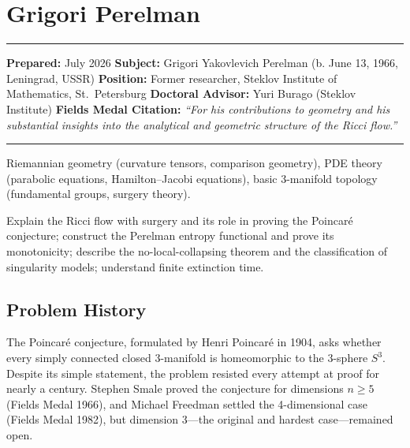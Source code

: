 \chapter{Grigori Perelman}\label{ch2006grigoriperelmandeclined:grigori-perelman-fields-medal-2006-declined}

\begin{center}\rule{0.5\linewidth}{0.5pt}\end{center}

\textbf{Prepared:} July 2026 \textbf{Subject:} Grigori Yakovlevich Perelman (b. June 13, 1966, Leningrad, USSR) \textbf{Position:} Former researcher, Steklov Institute of Mathematics, St.~Petersburg \textbf{Doctoral Advisor:} Yuri Burago (Steklov Institute) \textbf{Fields Medal Citation:} \emph{``For his contributions to geometry and his substantial insights into the analytical and geometric structure of the Ricci flow.''}

\begin{center}\rule{0.5\linewidth}{0.5pt}\end{center}

\begin{prereqs} Riemannian geometry (curvature tensors, comparison geometry), PDE theory (parabolic equations, Hamilton--Jacobi equations), basic 3-manifold topology (fundamental groups, surgery theory). \end{prereqs}

\begin{objectives} Explain the Ricci flow with surgery and its role in proving the Poincar\'e conjecture; construct the Perelman entropy functional and prove its monotonicity; describe the no-local-collapsing theorem and the classification of singularity models; understand finite extinction time. \end{objectives}

\section{Problem History}

The Poincar\'e conjecture, formulated by Henri Poincar\'e in 1904, asks whether every simply connected closed 3-manifold is homeomorphic to the 3-sphere $S^3$. Despite its simple statement, the problem resisted every attempt at proof for nearly a century. Stephen Smale proved the conjecture for dimensions $n \ge 5$ (Fields Medal 1966), and Michael Freedman settled the 4-dimensional case (Fields Medal 1982), but dimension 3---the original and hardest case---remained open.

